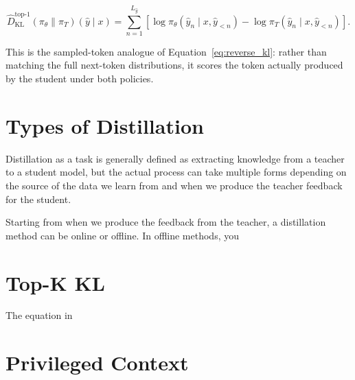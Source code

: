 \begin{equation}
\widehat{D}_{\mathrm{KL}}^{\mathrm{top}\mbox{-}1}
(\pi_\theta \| \pi_T)(\hat{y} \mid x)
= \sum_{n=1}^{L_{\hat{y}}}
\left[
\log \pi_\theta(\hat{y}_n \mid x, \hat{y}_{<n})
- \log \pi_T(\hat{y}_n \mid x, \hat{y}_{<n})
\right].
\label{eq:sampled_token_reverse_kl}
\end{equation}

This is the sampled-token analogue of Equation~\ref{eq:reverse_kl}: rather than matching the full next-token distributions, it scores the token actually produced by the student under both policies.

\section{Types of Distillation}

Distillation as a task is generally defined as extracting knowledge from a teacher to a student model, but the actual process can take multiple forms depending on the source of the data we learn from and when we produce the teacher feedback for the student.

Starting from when we produce the feedback from the teacher, a distillation method can be online or offline. In offline methods, you 

\section{Top-K KL}

The equation in 

\section{Privileged Context}
